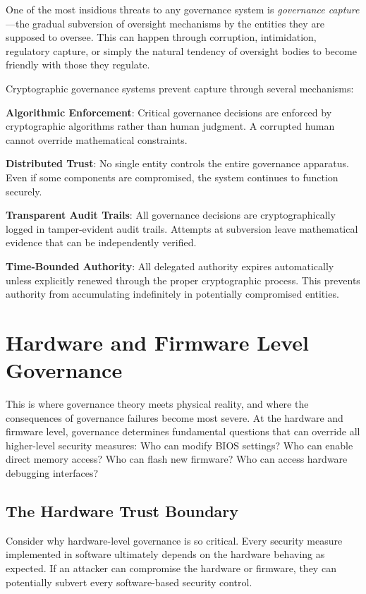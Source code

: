 One of the most insidious threats to any governance system is \textit{governance capture}—the gradual subversion of oversight mechanisms by the entities they are supposed to oversee. This can happen through corruption, intimidation, regulatory capture, or simply the natural tendency of oversight bodies to become friendly with those they regulate.

Cryptographic governance systems prevent capture through several mechanisms:

\textbf{Algorithmic Enforcement}: Critical governance decisions are enforced by cryptographic algorithms rather than human judgment. A corrupted human cannot override mathematical constraints.

\textbf{Distributed Trust}: No single entity controls the entire governance apparatus. Even if some components are compromised, the system continues to function securely.

\textbf{Transparent Audit Trails}: All governance decisions are cryptographically logged in tamper-evident audit trails. Attempts at subversion leave mathematical evidence that can be independently verified.

\textbf{Time-Bounded Authority}: All delegated authority expires automatically unless explicitly renewed through the proper cryptographic process. This prevents authority from accumulating indefinitely in potentially compromised entities.

\section{Hardware and Firmware Level Governance}

This is where governance theory meets physical reality, and where the consequences of governance failures become most severe. At the hardware and firmware level, governance determines fundamental questions that can override all higher-level security measures: Who can modify BIOS settings? Who can enable direct memory access? Who can flash new firmware? Who can access hardware debugging interfaces?

\subsection{The Hardware Trust Boundary}

Consider why hardware-level governance is so critical. Every security measure implemented in software ultimately depends on the hardware behaving as expected. If an attacker can compromise the hardware or firmware, they can potentially subvert every software-based security control.

